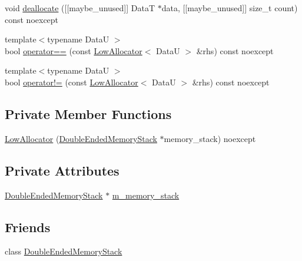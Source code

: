 \begin{DoxyCompactItemize}
\item 
void \hyperlink{classmage_1_1_double_ended_memory_stack_1_1_low_allocator_ae3f8edcb5b929749a627708434c9db73}{deallocate} (\mbox{[}\mbox{[}maybe\+\_\+unused\mbox{]}\mbox{]} DataT $\ast$data, \mbox{[}\mbox{[}maybe\+\_\+unused\mbox{]}\mbox{]} size\+\_\+t count) const noexcept
\item 
{\footnotesize template$<$typename DataU $>$ }\\bool \hyperlink{classmage_1_1_double_ended_memory_stack_1_1_low_allocator_a0353aa1e03cf37527ab24c268af8773f}{operator==} (const \hyperlink{classmage_1_1_double_ended_memory_stack_1_1_low_allocator}{Low\+Allocator}$<$ DataU $>$ \&rhs) const noexcept
\item 
{\footnotesize template$<$typename DataU $>$ }\\bool \hyperlink{classmage_1_1_double_ended_memory_stack_1_1_low_allocator_a521ea849cc47616c8a40b86185d08f9b}{operator!=} (const \hyperlink{classmage_1_1_double_ended_memory_stack_1_1_low_allocator}{Low\+Allocator}$<$ DataU $>$ \&rhs) const noexcept
\end{DoxyCompactItemize}
\subsection*{Private Member Functions}
\begin{DoxyCompactItemize}
\item 
\hyperlink{classmage_1_1_double_ended_memory_stack_1_1_low_allocator_a7c9da2fad702eedb0bb16de047c99238}{Low\+Allocator} (\hyperlink{classmage_1_1_double_ended_memory_stack}{Double\+Ended\+Memory\+Stack} $\ast$memory\+\_\+stack) noexcept
\end{DoxyCompactItemize}
\subsection*{Private Attributes}
\begin{DoxyCompactItemize}
\item 
\hyperlink{classmage_1_1_double_ended_memory_stack}{Double\+Ended\+Memory\+Stack} $\ast$ \hyperlink{classmage_1_1_double_ended_memory_stack_1_1_low_allocator_a662c9525b667d945f0f4685e773a8b61}{m\+\_\+memory\+\_\+stack}
\end{DoxyCompactItemize}
\subsection*{Friends}
\begin{DoxyCompactItemize}
\item 
class \hyperlink{classmage_1_1_double_ended_memory_stack_1_1_low_allocator_a10ae729d55b8c0017057250445835680}{Double\+Ended\+Memory\+Stack}
\end{DoxyCompactItemize}


